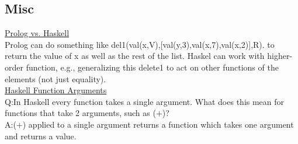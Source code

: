 \documentclass[10pt,landscape,a4paper]{article}
\begin{document}
\begin{multicols*}{5}
\subsection*{Misc}
\underline{Prolog vs. Haskell} \\
Prolog can do something like del1(val(x,V),[val(y,3),val(x,7),val(x,2)],R). to return the value of x as well as the rest of the list. Haskel can work with higher-order function, e.g., generalizing this delete1 to act on other functions of the elements (not just equality). \\
\underline{Haskell Function Arguments} \\
Q:\@ In Haskell every function takes a single argument. What does this mean for functions that take 2 arguments, such as (\(+\))? \\
A:\@ (\(+\)) applied to a single argument returns a function which takes one argument and returns a value.

\end{multicols*}
\end{document}
